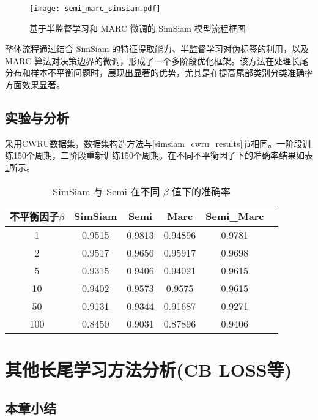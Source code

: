\documentclass[master]{thesis-uestc}
\begin{document}
\begin{figure}[h]
    \centering
    \texttt{[image: semi\_marc\_simsiam.pdf]}
    \caption{基于半监督学习和 MARC 微调的 SimSiam 模型流程框图}
    \label{semi_marc_simsiam}
\end{figure}

整体流程通过结合 SimSiam 的特征提取能力、半监督学习对伪标签的利用，以及 MARC 算法对决策边界的微调，形成了一个多阶段优化框架。该方法在处理长尾分布和样本不平衡问题时，展现出显著的优势，尤其是在提高尾部类别分类准确率方面效果显著。

\section{实验与分析}
采用CWRU数据集，数据集构造方法与\ref{simsiam_cwru_results}节相同。一阶段训练150个周期，二阶段重新训练150个周期。在不同不平衡因子下的准确率结果如表\ref{simsiam_semi_results}所示。

\begin{table}[h]
    \caption{SimSiam 与 Semi 在不同 $\beta$ 值下的准确率}
    \centering
    \begin{tabular}{cccccc}
    \toprule
    不平衡因子$\beta$  & SimSiam & Semi & Marc & Semi\_Marc \\
    \midrule
    1   & 0.9515  & 0.9813 & 0.94896 & 0.9781 \\
    2   & 0.9517  & 0.9656 & 0.95917 & 0.9698 \\
    5   & 0.9315  & 0.9406 & 0.94021 & 0.9615 \\
    10  & 0.9402  & 0.9573 & 0.9575  & 0.9615 \\
    50  & 0.9131  & 0.9344 & 0.91687 & 0.9271 \\
    100 & 0.8450  & 0.9031 & 0.87896 & 0.9406 \\
    \bottomrule
    \end{tabular}
    \label{simsiam_semi_results}
\end{table}


\chapter{其他长尾学习方法分析(CB LOSS等)}

\section{}


\section{本章小结}
\end{document}
